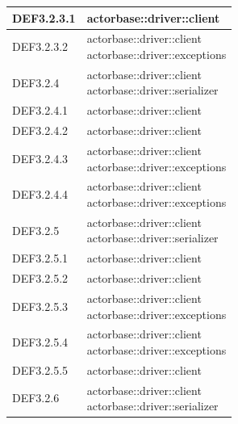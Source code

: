 \documentclass{scalatekids-article}
\begin{document}
\begin{longtable}[H]{|p{3.5cm}|p{7.5cm}|}
\hline
DEF3.2.3.1 & \multiLineCell[t]{actorbase::driver::client\\}\\
\hline
DEF3.2.3.2 & \multiLineCell[t]{actorbase::driver::client\\actorbase::driver::exceptions\\}\\
\hline
DEF3.2.4 & \multiLineCell[t]{actorbase::driver::client\\actorbase::driver::serializer\\}\\
\hline
DEF3.2.4.1 & \multiLineCell[t]{actorbase::driver::client\\}\\
\hline
DEF3.2.4.2 & \multiLineCell[t]{actorbase::driver::client\\}\\
\hline
DEF3.2.4.3 & \multiLineCell[t]{actorbase::driver::client\\actorbase::driver::exceptions\\}\\
\hline
DEF3.2.4.4 & \multiLineCell[t]{actorbase::driver::client\\actorbase::driver::exceptions\\}\\
\hline
DEF3.2.5 & \multiLineCell[t]{actorbase::driver::client\\actorbase::driver::serializer\\}\\
\hline
DEF3.2.5.1 & \multiLineCell[t]{actorbase::driver::client\\}\\
\hline
DEF3.2.5.2 & \multiLineCell[t]{actorbase::driver::client\\}\\
\hline
DEF3.2.5.3 & \multiLineCell[t]{actorbase::driver::client\\actorbase::driver::exceptions\\}\\
\hline
DEF3.2.5.4 & \multiLineCell[t]{actorbase::driver::client\\actorbase::driver::exceptions\\}\\
\hline
DEF3.2.5.5 & \multiLineCell[t]{actorbase::driver::client\\}\\
\hline
DEF3.2.6 & \multiLineCell[t]{actorbase::driver::client\\actorbase::driver::serializer\\}\\

\end{longtable}
\end{document}
